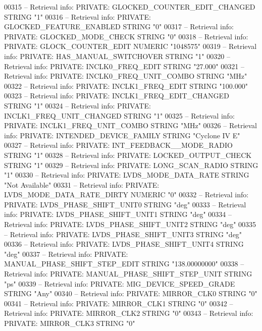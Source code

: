 \begin{DoxyCode}
{00315 \textcolor{keyword}{-- Retrieval info: PRIVATE: GLOCKED\_COUNTER\_EDIT\_CHANGED STRING "1"}
00316 \textcolor{keyword}{-- Retrieval info: PRIVATE: GLOCKED\_FEATURE\_ENABLED STRING "0"}
00317 \textcolor{keyword}{-- Retrieval info: PRIVATE: GLOCKED\_MODE\_CHECK STRING "0"}
00318 \textcolor{keyword}{-- Retrieval info: PRIVATE: GLOCK\_COUNTER\_EDIT NUMERIC "1048575"}
00319 \textcolor{keyword}{-- Retrieval info: PRIVATE: HAS\_MANUAL\_SWITCHOVER STRING "1"}
00320 \textcolor{keyword}{-- Retrieval info: PRIVATE: INCLK0\_FREQ\_EDIT STRING "27.000"}
00321 \textcolor{keyword}{-- Retrieval info: PRIVATE: INCLK0\_FREQ\_UNIT\_COMBO STRING "MHz"}
00322 \textcolor{keyword}{-- Retrieval info: PRIVATE: INCLK1\_FREQ\_EDIT STRING "100.000"}
00323 \textcolor{keyword}{-- Retrieval info: PRIVATE: INCLK1\_FREQ\_EDIT\_CHANGED STRING "1"}
00324 \textcolor{keyword}{-- Retrieval info: PRIVATE: INCLK1\_FREQ\_UNIT\_CHANGED STRING "1"}
00325 \textcolor{keyword}{-- Retrieval info: PRIVATE: INCLK1\_FREQ\_UNIT\_COMBO STRING "MHz"}
00326 \textcolor{keyword}{-- Retrieval info: PRIVATE: INTENDED\_DEVICE\_FAMILY STRING "Cyclone IV E"}
00327 \textcolor{keyword}{-- Retrieval info: PRIVATE: INT\_FEEDBACK\_\_MODE\_RADIO STRING "1"}
00328 \textcolor{keyword}{-- Retrieval info: PRIVATE: LOCKED\_OUTPUT\_CHECK STRING "1"}
00329 \textcolor{keyword}{-- Retrieval info: PRIVATE: LONG\_SCAN\_RADIO STRING "1"}
00330 \textcolor{keyword}{-- Retrieval info: PRIVATE: LVDS\_MODE\_DATA\_RATE STRING "Not Available"}
00331 \textcolor{keyword}{-- Retrieval info: PRIVATE: LVDS\_MODE\_DATA\_RATE\_DIRTY NUMERIC "0"}
00332 \textcolor{keyword}{-- Retrieval info: PRIVATE: LVDS\_PHASE\_SHIFT\_UNIT0 STRING "deg"}
00333 \textcolor{keyword}{-- Retrieval info: PRIVATE: LVDS\_PHASE\_SHIFT\_UNIT1 STRING "deg"}
00334 \textcolor{keyword}{-- Retrieval info: PRIVATE: LVDS\_PHASE\_SHIFT\_UNIT2 STRING "deg"}
00335 \textcolor{keyword}{-- Retrieval info: PRIVATE: LVDS\_PHASE\_SHIFT\_UNIT3 STRING "deg"}
00336 \textcolor{keyword}{-- Retrieval info: PRIVATE: LVDS\_PHASE\_SHIFT\_UNIT4 STRING "deg"}
00337 \textcolor{keyword}{-- Retrieval info: PRIVATE: MANUAL\_PHASE\_SHIFT\_STEP\_EDIT STRING "138.00000000"}
00338 \textcolor{keyword}{-- Retrieval info: PRIVATE: MANUAL\_PHASE\_SHIFT\_STEP\_UNIT STRING "ps"}
00339 \textcolor{keyword}{-- Retrieval info: PRIVATE: MIG\_DEVICE\_SPEED\_GRADE STRING "Any"}
00340 \textcolor{keyword}{-- Retrieval info: PRIVATE: MIRROR\_CLK0 STRING "0"}
00341 \textcolor{keyword}{-- Retrieval info: PRIVATE: MIRROR\_CLK1 STRING "0"}
00342 \textcolor{keyword}{-- Retrieval info: PRIVATE: MIRROR\_CLK2 STRING "0"}
00343 \textcolor{keyword}{-- Retrieval info: PRIVATE: MIRROR\_CLK3 STRING "0"}
}
\end{DoxyCode}
